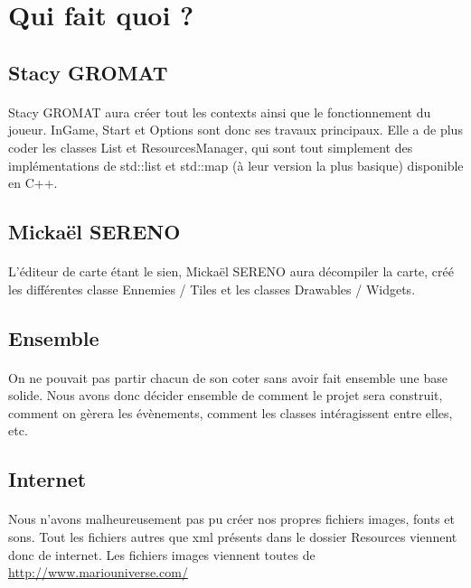 \section{Qui fait quoi ?}

\subsection{Stacy GROMAT}
\paragraph{} Stacy GROMAT aura créer tout les contexts ainsi que le fonctionnement du joueur. InGame, Start et Options sont donc ses travaux principaux. Elle a de plus coder les classes List et ResourcesManager, qui sont tout simplement des implémentations de std::list et std::map (à leur version la plus basique) disponible en C++. 

\subsection{Mickaël SERENO}
\paragraph{} L'éditeur de carte étant le sien, Mickaël SERENO aura décompiler la carte, créé les différentes classe Ennemies / Tiles et les classes Drawables / Widgets.

\subsection{Ensemble}
\paragraph{} On ne pouvait pas partir chacun de son coter sans avoir fait ensemble une base solide. Nous avons donc décider ensemble de comment le projet sera construit, comment on gèrera les évènements, comment les classes intéragissent entre elles, etc.

\subsection{Internet}
\paragraph{} Nous n'avons malheureusement pas pu créer nos propres fichiers images, fonts et sons. Tout les fichiers autres que xml présents dans le dossier Resources viennent donc de internet. Les fichiers images viennent toutes de \url{http://www.mariouniverse.com/} 
